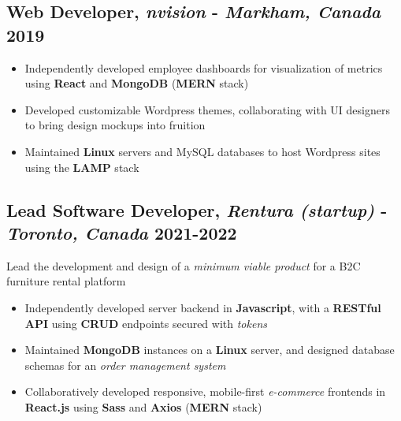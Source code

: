 \documentclass[9pt]{article}
\begin{document}
\subsection{Web Developer, \textit{nvision} - \normalsize\textit{Markham, Canada} \hfill \normalsize\textnormal{2019}}
\begin{itemize}
  \item Independently developed employee dashboards for visualization of metrics using \textbf{React} and \textbf{MongoDB} (\textbf{MERN} stack)
  \item Developed customizable Wordpress themes, collaborating with UI designers to bring design mockups into fruition
  \item Maintained \textbf{Linux} servers and MySQL databases to host Wordpress sites using the \textbf{LAMP} stack
\end{itemize}

\subsection{Lead Software Developer, \textit{Rentura (startup)} - \normalsize\textit{Toronto, Canada} \hfill \normalsize\textnormal{2021-2022}}
Lead the development and design of a \textit{minimum viable product} for a B2C furniture rental platform
\vspace{-0.5em}
\begin{itemize}
  \item Independently developed server backend in \textbf{Javascript}, with a \textbf{RESTful API} using \textbf{CRUD} endpoints secured with \textit{tokens}
  \item Maintained \textbf{MongoDB} instances on a \textbf{Linux} server, and designed database schemas for an \textit{order management system}
  \item Collaboratively developed responsive, mobile-first \textit{e-commerce} frontends in \textbf{React.js} using \textbf{Sass} and \textbf{Axios} (\textbf{MERN} stack)
\end{itemize}

\end{document}
